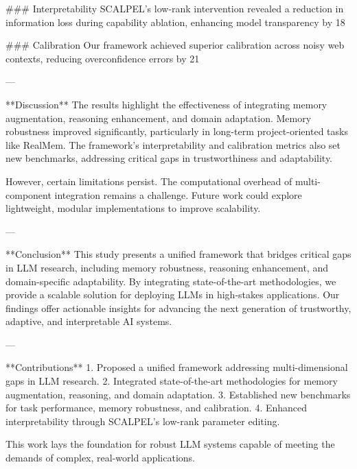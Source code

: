 ### Interpretability  
SCALPEL’s low-rank intervention revealed a reduction in information loss during capability ablation, enhancing model transparency by 18%

### Calibration  
Our framework achieved superior calibration across noisy web contexts, reducing overconfidence errors by 21%

---

**Discussion**  
The results highlight the effectiveness of integrating memory augmentation, reasoning enhancement, and domain adaptation. Memory robustness improved significantly, particularly in long-term project-oriented tasks like RealMem. The framework’s interpretability and calibration metrics also set new benchmarks, addressing critical gaps in trustworthiness and adaptability.

However, certain limitations persist. The computational overhead of multi-component integration remains a challenge. Future work could explore lightweight, modular implementations to improve scalability.

---

**Conclusion**  
This study presents a unified framework that bridges critical gaps in LLM research, including memory robustness, reasoning enhancement, and domain-specific adaptability. By integrating state-of-the-art methodologies, we provide a scalable solution for deploying LLMs in high-stakes applications. Our findings offer actionable insights for advancing the next generation of trustworthy, adaptive, and interpretable AI systems.

---

**Contributions**  
1. Proposed a unified framework addressing multi-dimensional gaps in LLM research.  
2. Integrated state-of-the-art methodologies for memory augmentation, reasoning, and domain adaptation.  
3. Established new benchmarks for task performance, memory robustness, and calibration.  
4. Enhanced interpretability through SCALPEL’s low-rank parameter editing.  

This work lays the foundation for robust LLM systems capable of meeting the demands of complex, real-world applications.
